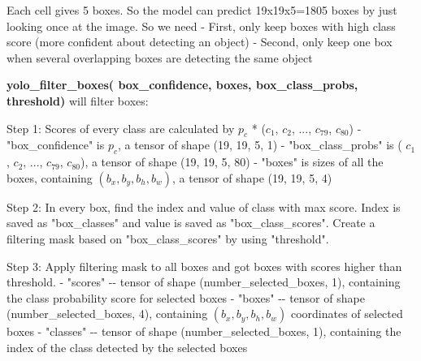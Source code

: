 \documentclass[11pt]{article}
\begin{document}
Each cell gives 5 boxes. So the model can predict 19x19x5=1805 boxes by
just looking once at the image. So we need - First, only keep boxes with
high class score (more confident about detecting an object) - Second,
only keep one box when several overlapping boxes are detecting the same
object 

    \textbf{yolo\_filter\_boxes( box\_confidence, boxes, box\_class\_probs,
threshold)} will filter boxes:

Step 1: Scores of every class are calculated by \(p_c\) * (\(c_1\),
\(c_2\), ..., \(c_{79}\), \(c_{80}\)) - "box\_confidence" is \(p_c\), a
tensor of shape (19, 19, 5, 1) - "box\_class\_probs" is ( \(c_1\),
\(c_2\), ..., \(c_{79}\), \(c_{80}\)), a tensor of shape (19, 19, 5, 80)
- "boxes" is sizes of all the boxes, containing
\((b_x, b_y, b_h, b_w)\), a tensor of shape (19, 19, 5, 4)

Step 2: In every box, find the index and value of class with max score.
Index is saved as "box\_classes" and value is saved as
"box\_class\_scores". Create a filtering mask based on
"box\_class\_scores" by using "threshold".

Step 3: Apply filtering mask to all boxes and got boxes with scores
higher than threshold. - "scores" -\/- tensor of shape
(number\_selected\_boxes, 1), containing the class probability score for
selected boxes - "boxes" -\/- tensor of shape (number\_selected\_boxes,
4), containing \((b_x, b_y, b_h, b_w)\) coordinates of selected boxes -
"classes" -\/- tensor of shape (number\_selected\_boxes, 1), containing
the index of the class detected by the selected boxes
\end{document}
